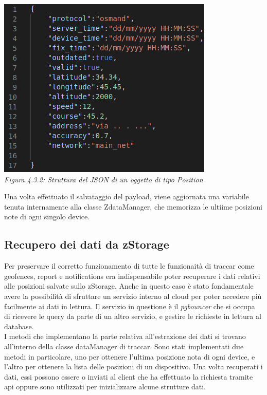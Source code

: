 \documentclass[a4paper,titlepage,12pt]{book}
\begin{document}
\begin{center}
\includegraphics[scale=0.6]{images/json_position.png}\\ 
\textit{Figura 4.3.2: Struttura del JSON di un oggetto di tipo Position}
\end{center}

Una volta effettuato il salvataggio del payload, viene aggiornata una variabile tenuta internamente alla classe ZdataManager, che memorizza le ultiime posizioni note di ogni singolo device.

\subsection{\sffamily
Recupero dei dati da zStorage}
Per preservare il corretto funzionamento di tutte le funzionaità di traccar come geofences, report e notifications era indispensabile poter recuperare i dati relativi alle posizioni salvate sullo zStorage. Anche in questo caso è stato fondamentale avere la possibilità di sfruttare un servizio interno al cloud per poter accedere più facilmente ai dati in lettura. Il servizio in questione è il \textit{pgbouncer} che si occupa di ricevere le query da parte di un altro servizio, e gestire le richieste in lettura al database. \\
I metodi che implementano la parte relativa all'estrazione dei dati si trovano all'interno della classe dataManager di traccar. Sono stati implementati due metodi in particolare, uno per ottenere l'ultima posizione nota di ogni device, e l'altro per ottenere la lista delle posizioni di un dispositivo. Una volta recuperati i dati, essi possono essere o inviati al client che ha effettuato la richiesta tramite api oppure sono utilizzati per inizializzare alcune strutture dati.
\end{document}
